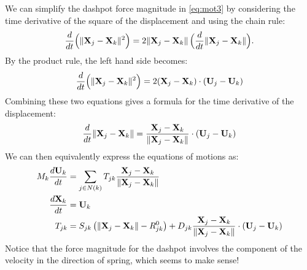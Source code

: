 \documentclass[10pt]{article}
\begin{document}
We can simplify the dashpot force magnitude in \eqref{eq:mot3} by considering the time derivative of the square of the displacement and using the chain rule:
\begin{align*}
\frac{d}{dt} \Big(\|{\bf X}_j - {\bf X}_k\|^2\Big) = 2 \|{\bf X}_j - {\bf X}_k\| \, \Big( \frac{d}{dt} \|{\bf X}_j - {\bf X}_k \| \Big).
\end{align*}  
By the product rule, the left hand side becomes:
\begin{align*}
\frac{d}{dt} \Big(\|{\bf X}_j - {\bf X}_k\|^2\Big) = 2({\bf X}_j - {\bf X}_k) \cdot ({\bf U}_j - {\bf U}_k)
\end{align*}
Combining these two equations gives a formula for the time derivative of the displacement:
\begin{align*}
\frac{d}{dt} \|{\bf X}_j - {\bf X}_k \| = \frac{{\bf X}_j - {\bf X}_k}{\|{\bf X}_j - {\bf X}_k\|} \cdot ({\bf U}_j - {\bf U}_k)
\end{align*}
We can then equivalently express the equations of motions as: 
\begin{align}
\label{eq:mot1}
M_k \frac{d {\bf U}_k}{dt} &= \sum_{j \in N(k)} T_{jk} \frac{{\bf X}_j - {\bf X}_k}{\| {\bf X}_j - {\bf X}_k \|} \\
\label{eq:mot2}
\frac{d {\bf X}_k}{dt} &= {\bf U}_k \\
\label{eq:mot3}
T_{jk} &= S_{jk} \left( \|{\bf X}_j - {\bf X}_k\| - R^0_{jk} \right) + D_{jk} \frac{{\bf X}_j - {\bf X}_k}{\|{\bf X}_j - {\bf X}_k\|} \cdot ({\bf U}_j - {\bf U}_k)
\end{align}
Notice that the force magnitude for the dashpot involves the component of the velocity in the direction of spring, which seems to make sense!
\end{document}
